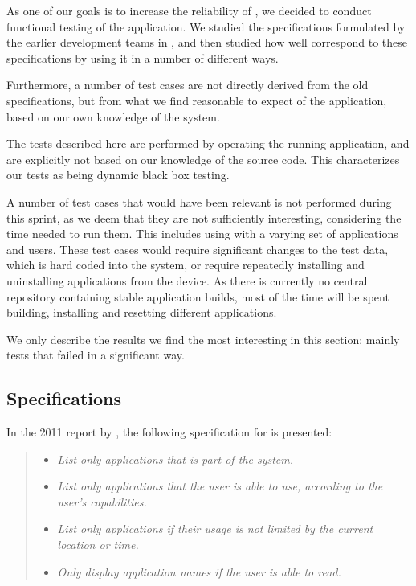 As one of our goals is to increase the reliability of \launcher, we decided to conduct functional testing of the application.
We studied the specifications formulated by the earlier development teams in \citet{launcher2011,launcher2012}, and then studied how well \launcher correspond to these specifications by using it in a number of different ways. 

Furthermore, a number of test cases are not directly derived from the old specifications, but from what we find reasonable to expect of the application, based on our own knowledge of the system.

The tests described here are performed by operating the running application, and are explicitly not based on our knowledge of the source code. 
This characterizes our tests as being dynamic black box testing. 

A number of test cases that would have been relevant is not performed during this sprint, as we deem that they are not sufficiently interesting, considering the time needed to run them. 
This includes using \launcher with a varying set of applications and users.
These test cases would require significant changes to the test data, which is hard coded into the \giraf system, or require repeatedly installing and uninstalling applications from the device.
As there is currently no central repository containing stable application builds, most of the time will be spent building, installing and resetting different applications.

We only describe the results we find the most interesting in this section; mainly tests that failed in a significant way.

\subsection{Specifications}
In the 2011 report by \citet{launcher2011}, the following specification for \launcher is presented:

\begin{quote}
\begin{itemize}
	\item \textit{List only applications that is part of the \giraf system.}
	\item \textit{List only applications that the user is able to use, according to the user's capabilities.}
	\item \textit{List only applications if their usage is not limited by the current location or time.}
	\item \textit{Only display application names if the user is able to read.}
\end{itemize}
\end{quote}

